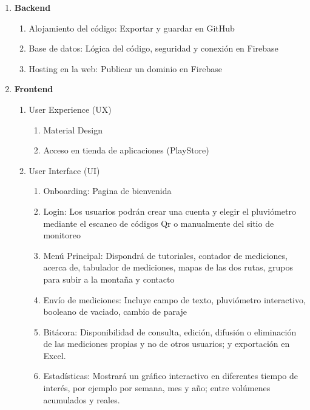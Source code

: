 \begin{enumerate}
  \item \textbf{Backend}
  \begin{enumerate}
    \item Alojamiento del código: Exportar y guardar en GitHub
    \item Base de datos: Lógica del código, seguridad y conexión en Firebase
    \item Hosting en la web: Publicar un dominio en Firebase
  \end{enumerate}
  \item \textbf{Frontend}
  \begin{enumerate}
    \item User Experience (UX)
     \begin{enumerate}
      \item Material Design
      \item Acceso en tienda de aplicaciones (PlayStore)
     \end{enumerate}
    \item User Interface (UI)
     \begin{enumerate}
    \item Onboarding: Pagina de bienvenida 
    \item Login: Los usuarios podrán crear una cuenta y elegir el pluviómetro mediante el escaneo de códigos Qr o manualmente del sitio de monitoreo 
    \item Menú Principal: Dispondrá de tutoriales, contador de mediciones, acerca de, tabulador de mediciones, mapas de las dos rutas, grupos para subir a la montaña y contacto
    \item Envío de mediciones: Incluye campo de texto, pluviómetro interactivo, booleano de vaciado, cambio de paraje
    \item Bitácora: Disponibilidad de consulta, edición, difusión o eliminación de las mediciones propias y no de otros usuarios; y exportación en Excel.
    \item Estadísticas: Mostrará un gráfico interactivo en diferentes tiempo de interés, por ejemplo por semana, mes y año; entre volúmenes acumulados y reales.
\end{enumerate}
  \end{enumerate}
\end{enumerate}











